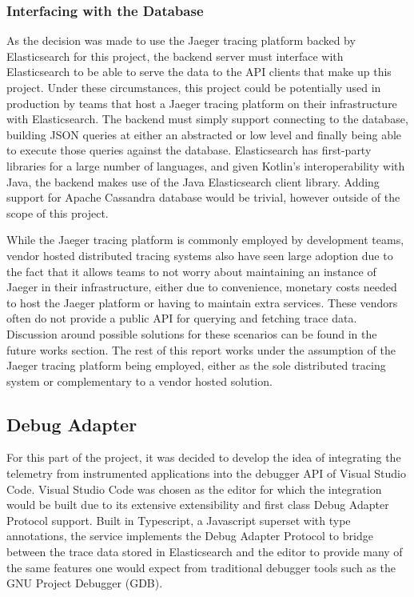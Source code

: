 \documentclass[12pt,pdftex,titlepage]{report}
\begin{document}
                \subsubsection{Interfacing with the Database}
                    As the decision was made to use the Jaeger tracing platform backed by Elasticsearch for this project, the backend server must interface with Elasticsearch
                    to be able to serve the data to the API clients that make up this project. Under these circumstances, this project could be potentially used in production
                    by teams that host a Jaeger tracing platform on their infrastructure with Elasticsearch. The backend must simply support connecting to the database, building 
                    JSON queries at either an abstracted or low level and finally being able to execute those queries against the database. Elasticsearch has first-party libraries
                    for a  large number of languages, and given Kotlin's interoperability with Java, the backend makes use of the Java Elasticsearch client library. Adding support 
                    for Apache Cassandra database would be trivial, however outside of the scope of this project.

                    While the Jaeger tracing platform is commonly employed by development teams, vendor hosted distributed tracing systems also have seen large adoption due to the 
                    fact that it allows teams to not worry about maintaining an instance of Jaeger in their infrastructure, either due to convenience, monetary costs needed to host
                    the Jaeger platform or having to maintain extra services. These vendors often do not provide a public API for querying and fetching trace data. Discussion around
                    possible solutions for these scenarios can be found in the future works section. The rest of this report works under the assumption of the Jaeger tracing platform
                    being employed, either as the sole distributed tracing system or complementary to a vendor hosted solution. 

            \subsection{Debug Adapter}
                For this part of the project, it was decided to develop the idea of integrating the telemetry from instrumented applications into the debugger API of Visual Studio Code.
                Visual Studio Code was chosen as the editor for which the integration would be built due to its extensive extensibility and first class Debug Adapter Protocol support. 
                Built in Typescript, a Javascript superset with type annotations, the service implements the Debug Adapter Protocol to bridge between the trace data stored in Elasticsearch
                and the editor to provide many of the same features one would expect from traditional debugger tools such as the GNU Project Debugger (GDB).
\end{document}
